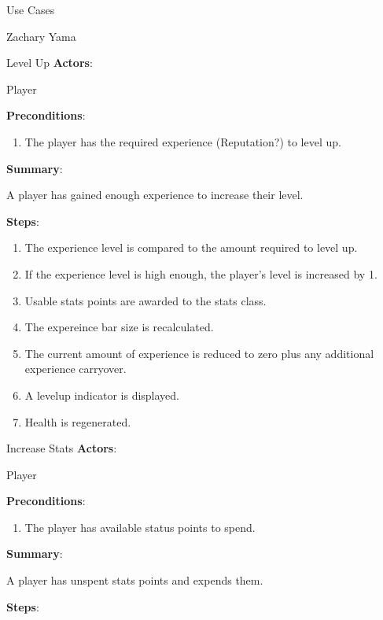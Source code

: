 \documentclass[12pt]{report}
\begin{document}
\begin{section}{Use Cases}
\begin{subsection}{Zachary Yama}
\begin{subsubsection}{Level Up}
\textbf{Actors}:

Player

\textbf{Preconditions}:

\begin{enumerate}
\item The player has the required experience (Reputation?) to level up.
\end{enumerate}

\textbf{Summary}:

A player has gained enough experience to increase their level. 

\textbf{Steps}:

\begin{enumerate}
\item The experience level is compared to the amount required to level up. 
\item If the experience level is high enough, the player's level is
increased by 1.
\item Usable stats points are awarded to the stats class. 
\item The expereince bar size is recalculated.
\item The current amount of experience is reduced to zero plus any
additional experience carryover.
\item A levelup indicator is displayed.
\item Health is regenerated.
\end{enumerate}
\end{subsubsection}

\begin{subsubsection}{Increase Stats}
\textbf{Actors}:

Player

\textbf{Preconditions}:

\begin{enumerate}
\item The player has available status points to spend.
\end{enumerate}

\textbf{Summary}:

A player has unspent stats points and expends them. 

\textbf{Steps}:


\end{subsubsection}
\end{subsection}
\end{section}
\end{document}

